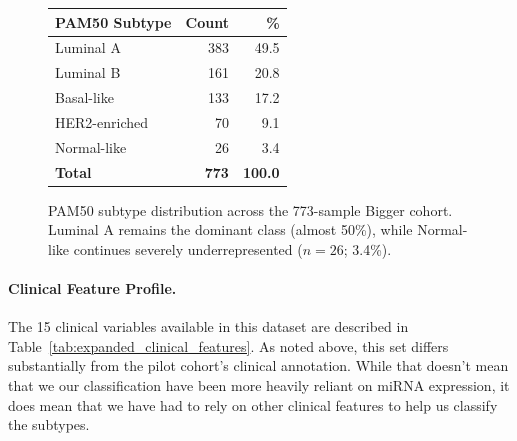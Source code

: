 \begin{figure}[!ht]
    \centering
    \begin{minipage}{0.46\textwidth}
        \centering
        \label{tab:pam50-distribution_bc}
        \begin{tabular}{lrr}
            \hline
            \textbf{PAM50 Subtype} & \textbf{Count} & \textbf{\%} \\
            \hline
            Luminal A     & 383 & 49.5 \\
            Luminal B     &  161 & 20.8 \\
            Basal-like    &  133 & 17.2 \\
            HER2-enriched &  70 & 9.1 \\
            Normal-like   &   26 &  3.4 \\
            \hline
            \textbf{Total} & \textbf{773} & \textbf{100.0} \\
            \hline
        \end{tabular}
    \end{minipage}
    \hfill
    \begin{minipage}{0.50\textwidth}
        \centering
    \end{minipage}
    \caption{PAM50 subtype distribution across the 773-sample Bigger cohort.
    Luminal A remains the dominant class (almost 50\%), while Normal-like continues severely
    underrepresented ($n = 26$; 3.4\%).}
    \label{fig:expanded_subtype_dist}
\end{figure}

\paragraph{Clinical Feature Profile.}
The 15 clinical variables available in this dataset are described in
Table~\ref{tab:expanded_clinical_features}. As noted above, this set differs
substantially from the pilot cohort's clinical annotation. While that doesn't mean 
that we our classification have been more heavily reliant on miRNA expression, it does 
mean that we have had to rely on other clinical features to help us classify the subtypes.

